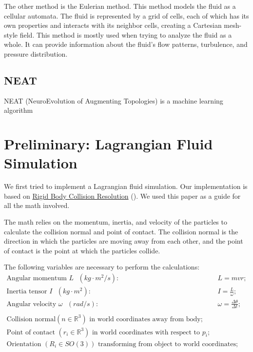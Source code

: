 \documentclass[a4paper,12pt,titlepage]{article}
\begin{document}
The other method is the Eulerian method. This method models the fluid as a
cellular automata. The fluid is represented by a grid of cells, each of which
has its own properties and interacts with its neighbor cells, creating a Cartesian
mesh-style field. This method is mostly used when trying to analyze the fluid as a whole.
It can provide information about the fluid's flow patterns, turbulence, and pressure distribution. 

\subsection{NEAT}
NEAT (NeuroEvolution of Augmenting Topologies) is a machine learning algorithm

\pagebreak
\section{Preliminary: Lagrangian Fluid Simulation}
We first tried to implement a Lagrangian fluid simulation.
Our implementation is based on \hyperlink{http://www.hakenberg.de/diffgeo/collision_resolution.htm}{Rigid Body Collision Resolution}
(\cite{hakenberg}). We used this paper as a guide for all the math involved.

The math relies on the momentum, inertia, and velocity of the particles to
calculate the collision normal and point of contact. The collision normal is
the direction in which the particles are moving away from each other, and the
point of contact is the point at which the particles collide.

The following variables are necessary to perform the calculations:
\[
\begin{array}{ll}
	\text{Angular momentum $L$ } (kg\cdot m^2/s): & L = mvr; \\
	\text{Inertia tensor $I$ } (kg\cdot m^2): & I = \frac{L}{\omega}; \\
    \text{Angular velocity $\omega$ } (rad/s): & \omega = \frac{\Delta \theta}{\Delta t}; \\

	\\

	\text{Collision normal} (n \in \mathbb{R}^3) \text{ in world coordinates away from body}; \\
	\text{Point of contact } (r_i \in \mathbb{R}^3) \text{ in world coordinates with respect to $p_i$}; \\
	\text{Orientation } (R_i \in SO(3)) \text{ transforming from object to world coordinates}; \\
\end{array}
\]
\end{document}
